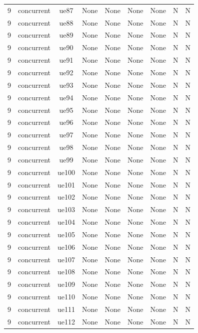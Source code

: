 \begin{table}[ht]
\begin{tabular}{|c|c|c|c|c|c|c|c|c|}
9 & concurrent & ue87 & None & None & None & None & N & N \\
9 & concurrent & ue88 & None & None & None & None & N & N \\
9 & concurrent & ue89 & None & None & None & None & N & N \\
9 & concurrent & ue90 & None & None & None & None & N & N \\
9 & concurrent & ue91 & None & None & None & None & N & N \\
9 & concurrent & ue92 & None & None & None & None & N & N \\
9 & concurrent & ue93 & None & None & None & None & N & N \\
9 & concurrent & ue94 & None & None & None & None & N & N \\
9 & concurrent & ue95 & None & None & None & None & N & N \\
9 & concurrent & ue96 & None & None & None & None & N & N \\
9 & concurrent & ue97 & None & None & None & None & N & N \\
9 & concurrent & ue98 & None & None & None & None & N & N \\
9 & concurrent & ue99 & None & None & None & None & N & N \\
9 & concurrent & ue100 & None & None & None & None & N & N \\
9 & concurrent & ue101 & None & None & None & None & N & N \\
9 & concurrent & ue102 & None & None & None & None & N & N \\
9 & concurrent & ue103 & None & None & None & None & N & N \\
9 & concurrent & ue104 & None & None & None & None & N & N \\
9 & concurrent & ue105 & None & None & None & None & N & N \\
9 & concurrent & ue106 & None & None & None & None & N & N \\
9 & concurrent & ue107 & None & None & None & None & N & N \\
9 & concurrent & ue108 & None & None & None & None & N & N \\
9 & concurrent & ue109 & None & None & None & None & N & N \\
9 & concurrent & ue110 & None & None & None & None & N & N \\
9 & concurrent & ue111 & None & None & None & None & N & N \\
9 & concurrent & ue112 & None & None & None & None & N & N \\

\end{tabular}
\end{table}
